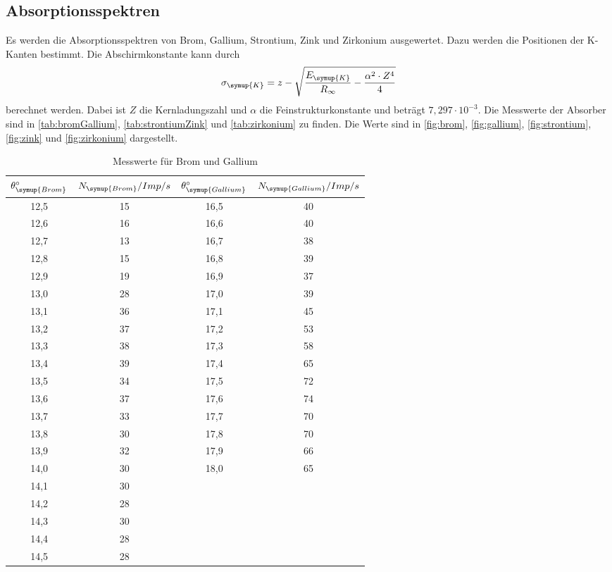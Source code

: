 \subsection{Absorptionsspektren}
\label{sec:Absorptionsspektren}
Es werden die Absorptionsspektren von Brom, Gallium, Strontium, Zink und Zirkonium ausgewertet. Dazu werden die
Positionen der K-Kanten bestimmt. Die Abschirmkonstante kann durch
\begin{align*}
  \sigma_{\symup{K}} = z - \sqrt{\frac{E_{\symup{K}}}{R_{\infty}}-\frac{\alpha^2 \cdot Z^4}{4}}
\end{align*}
berechnet werden. Dabei ist $Z$ die Kernladungszahl und $\alpha$ die Feinstrukturkonstante und beträgt $7,297\cdot
10^{-3}$.
Die Messwerte der Absorber sind in \autoref{tab:bromGallium}, \autoref{tab:strontiumZink} und \autoref{tab:zirkonium} zu finden.
Die Werte sind in \autoref{fig:brom}, \autoref{fig:gallium}, \autoref{fig:strontium}, \autoref{fig:zink} und
\autoref{fig:zirkonium} dargestellt.
\begin{table}
  \centering
  \caption{Messwerte für Brom und Gallium}
  \label{tab:bromGallium}
  \begin{tabular}{c c | c c}
    \toprule
    $\theta_{\symup{Brom}}^{\circ}$ & $N_{\symup{Brom}}/Imp/s$ & $\theta_{\symup{Gallium}}^{\circ}$ & $N_{\symup{Gallium}}/Imp/s$ \\
    \midrule
    12,5 & 15 & 16,5  & 40 \\
    12,6 & 16 & 16,6  & 40 \\
    12,7 & 13 & 16,7  & 38 \\
    12,8 & 15 & 16,8  & 39 \\
    12,9 & 19 & 16,9  & 37 \\
    13,0 & 28 & 17,0  & 39 \\
    13,1 & 36 & 17,1  & 45 \\
    13,2 & 37 & 17,2  & 53 \\
    13,3 & 38 & 17,3  & 58 \\
    13,4 & 39 & 17,4  & 65 \\
    13,5 & 34 & 17,5  & 72 \\
    13,6 & 37 & 17,6  & 74 \\
    13,7 & 33 & 17,7  & 70 \\
    13,8 & 30 & 17,8  & 70 \\
    13,9 & 32 & 17,9  & 66 \\
    14,0 & 30 & 18,0  & 65 \\
    14,1 & 30 &       &    \\
    14,2 & 28 &       &    \\
    14,3 & 30 &       &    \\
    14,4 & 28 &       &    \\
    14,5 & 28 &       &    \\
    \bottomrule
  \end{tabular}
\end{table}


